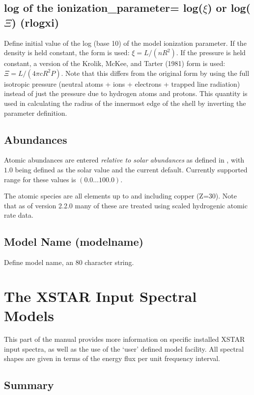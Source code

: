 \subsection{log of the ionization\_parameter= log($\xi$) or log($\Xi$) (rlogxi)}    

Define initial value of the log (base 10) of the 
model ionization parameter.  If the density is
held constant, the \cite{Tarter1969} form is used:
$\xi = L/(nR^2)$.  If the pressure is held constant, a version of
the Krolik, McKee, and Tarter (1981) form is used: 
$\Xi = L/(4\pi c R^2 P)$.  Note that this differs from the original
form by using the full isotropic pressure (neutral atoms + ions + electrons
+ trapped line radiation) instead of just the pressure due to hydrogen
atoms and protons.  This quantity is used in calculating the radius
of the innermost edge of the shell by inverting the parameter definition.


\subsection{Abundances}  

Atomic abundances are entered {\it relative to solar abundances} as 
defined in \cite{Grevesse1996}, with $1.0$ being defined as the solar 
value and the current default.  Currently supported range for these values 
is $(0.0 \ldots 100.0)$.

The atomic species are all elements up to and including copper (Z=30).  Note 
that as of version 2.2.0 many of these are treated using scaled hydrogenic 
atomic rate data.


\subsection{Model Name (modelname)}  

Define model name, an 80 character string.


\section{The XSTAR Input Spectral Models}
\label{sec:spectra}

This part of the manual provides more information on specific installed 
XSTAR input spectra, as well as the use of the `user' defined model facility.
All spectral shapes are given in terms of the energy flux per unit frequency
interval. 

\subsection{Summary}

